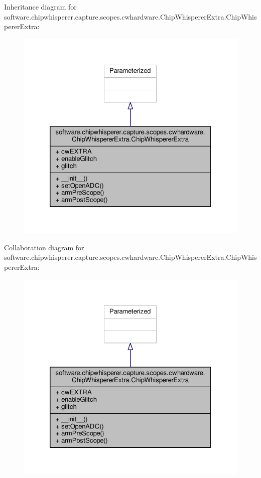 Inheritance diagram for software.\+chipwhisperer.\+capture.\+scopes.\+cwhardware.\+Chip\+Whisperer\+Extra.\+Chip\+Whisperer\+Extra\+:\nopagebreak
\begin{figure}[H]
\begin{center}
\leavevmode
\includegraphics[width=325pt]{d3/d4e/classsoftware_1_1chipwhisperer_1_1capture_1_1scopes_1_1cwhardware_1_1ChipWhispererExtra_1_1ChipWhispererExtra__inherit__graph}
\end{center}
\end{figure}


Collaboration diagram for software.\+chipwhisperer.\+capture.\+scopes.\+cwhardware.\+Chip\+Whisperer\+Extra.\+Chip\+Whisperer\+Extra\+:\nopagebreak
\begin{figure}[H]
\begin{center}
\leavevmode
\includegraphics[width=325pt]{df/d94/classsoftware_1_1chipwhisperer_1_1capture_1_1scopes_1_1cwhardware_1_1ChipWhispererExtra_1_1ChipWhispererExtra__coll__graph}
\end{center}
\end{figure}


